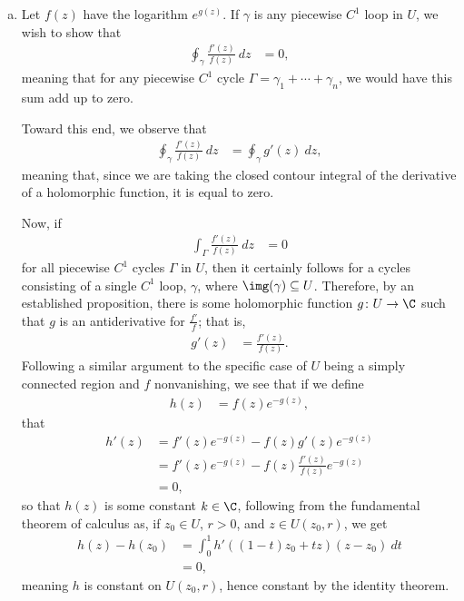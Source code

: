 \documentclass[10pt]{mypackage}
\begin{document}
\begin{solution}\hfill
  \begin{enumerate}[(a)]
    \item Let $f(z)$ have the logarithm $e^{g(z)}$. If $\gamma$ is any piecewise $C^{1}$ loop in $U$, we wish to show that
      \begin{align*}
        \oint_{\gamma}^{} \frac{f'(z)}{f(z)}\:dz &= 0,
      \end{align*}
      meaning that for any piecewise $C^{1}$ cycle $\Gamma = \gamma_1 + \cdots + \gamma_n$, we would have this sum add up to zero.\newline

      Toward this end, we observe that
      \begin{align*}
        \oint_{\gamma}^{} \frac{f'(z)}{f(z)}\:dz &= \oint_{\gamma}^{} g'(z)\:dz,
      \end{align*}
      meaning that, since we are taking the closed contour integral of the derivative of a holomorphic function, it is equal to zero.\newline

      Now, if
      \begin{align*}
        \int_{\Gamma}^{} \frac{f'(z)}{f(z)}\:dz &= 0
      \end{align*}
      for all piecewise $C^{1}$ cycles $\Gamma$ in $U$, then it certainly follows for a cycles consisting of a single $C^{1}$ loop, $\gamma$, where $\img(\gamma)\subseteq U$. Therefore, by an established proposition, there is some holomorphic function $g\colon U\rightarrow \C$ such that $g$ is an antiderivative for $\frac{f'}{f}$; that is,
      \begin{align*}
        g'(z) &= \frac{f'(z)}{f(z)}.
      \end{align*}
      Following a similar argument to the specific case of $U$ being a simply connected region and $f$ nonvanishing, we see that if we define
      \begin{align*}
        h(z) &= f(z)e^{-g(z)},
      \end{align*}
      that
      \begin{align*}
        h'(z) &= f'(z)e^{-g(z)} - f(z)g'(z)e^{-g(z)}\\
              &= f'(z)e^{-g(z)} - f(z)\frac{f'(z)}{f(z)}e^{-g(z)}\\
              &= 0,
      \end{align*}
      so that $h(z)$ is some constant $k\in \C$, following from the fundamental theorem of calculus as, if $z_0\in U$, $r> 0$, and $z\in U\left( z_0,r \right)$, we get
      \begin{align*}
        h(z) - h\left(z_0\right) &= \int_{0}^{1} h'\left( \left( 1-t \right)z_0 + tz \right)\left( z-z_0 \right)\:dt\\
                                 &= 0,
      \end{align*}
      meaning $h$ is constant on $U\left( z_0,r \right)$, hence constant by the identity theorem.\newline


\end{enumerate}
\end{solution}
\end{document}
